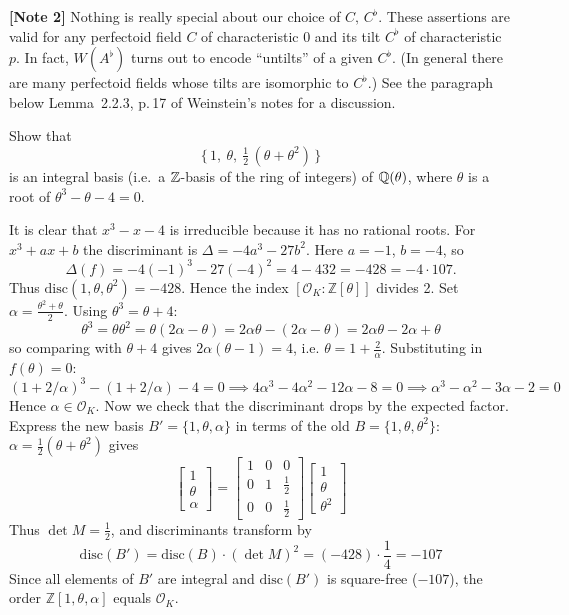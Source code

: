 \documentclass[12pt]{article}  %
\begin{document}
\noindent\textbf{[Note 2]} Nothing is really special about our choice of $C,\,C^\flat$.
These assertions are valid for any perfectoid field $C$ of characteristic $0$ and its tilt
$C^\flat$ of characteristic $p$. In fact, $W(A^\flat)$ turns out to encode ``untilts'' of a
given $C^\flat$. (In general there are many perfectoid fields whose tilts are isomorphic to
$C^\flat$.) See the paragraph below Lemma~2.2.3, p.\,17 of Weinstein’s notes for a discussion.

\bigskip

\begin{problem}[3]
Show that
\[
  \bigl\{\,1,\ \theta,\ \tfrac12\,(\theta+\theta^2)\,\bigr\}
\]
is an integral basis (i.e.\ a $\mathbb{Z}$-basis of the ring of integers) of $\mathbb{Q}(\theta)$,
where $\theta$ is a root of $\theta^3-\theta-4=0$.
\end{problem}

\begin{solution}
    It is clear that $x^3 - x - 4$ is irreducible because it has no rational roots. For $x^3+ax+b$ the discriminant is $\Delta=-4a^3-27b^2$.
    Here $a=-1$, $b=-4$, so
    \[
    \Delta(f)=-4(-1)^3-27(-4)^2=4-432=-428=-4\cdot 107.
    \]
    Thus $\mathrm{disc}(1,\theta,\theta^2)=-428$.
    Hence the index $[\mathcal{O}_K:\mathbb{Z}[\theta]]$ divides 2.
    Set $\alpha = \frac{\theta^2+\theta}{2}$.
    Using $\theta^3=\theta+4$:
    \[
    \theta^3=\theta\theta^2=\theta(2\alpha-\theta)=2\alpha\theta-(2\alpha-\theta)=2\alpha\theta-2\alpha+\theta
    \]
    so comparing with $\theta+4$ gives $2\alpha(\theta-1)=4$, i.e.
    $\theta=1+\frac{2}{\alpha}$.
    Substituting in $f(\theta)=0$:
    \[
    (1+2/\alpha)^3-(1+2/\alpha)-4=0
    \implies 4\alpha^3-4\alpha^2-12\alpha-8=0
    \implies \alpha^3-\alpha^2-3\alpha-2=0
    \]
Hence $\alpha\in\mathcal{O}_K$. Now we check that the discriminant drops by the expected factor.
    Express the new basis $B'=\{1,\theta,\alpha\}$ in terms of the old $B=\{1,\theta,\theta^2\}$:
    $\alpha=\frac{1}{2}(\theta+\theta^2)$ gives
    \[
    \begin{bmatrix}1\\ \theta\\ \alpha\end{bmatrix} = 
    \begin{bmatrix}
    1&0&0\\
    0&1&\frac{1}{2}\\
    0&0&\frac{1}{2}
    \end{bmatrix}
    \begin{bmatrix}1\\ \theta\\ \theta^2\end{bmatrix}
    \]
    Thus $\det M=\frac{1}{2}$, and discriminants transform by
    \[\mathrm{disc}(B')=\mathrm{disc}(B)\cdot(\det M)^2=(-428)\cdot \frac{1}{4}=-107\]
    Since all elements of $B'$ are integral and $\mathrm{disc}(B')$ is square-free ($-107$), the order $\mathbb{Z}[1,\theta,\alpha]$ equals $\mathcal{O}_K$.
\end{solution}
\end{document}
